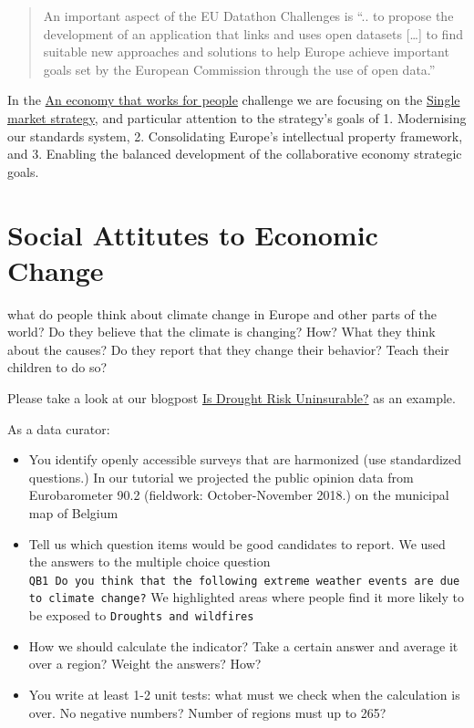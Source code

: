 \documentclass[
  a4paper,
  openany, a4paper, oneside]{book}
\providecommand{\tightlist}{%
  \setlength{\itemsep}{0pt}\setlength{\parskip}{0pt}}
\begin{document}
\begin{quote}
An important aspect of the EU Datathon Challenges is ``.. to propose the development of an application that links and uses open datasets {[}\ldots{]} to find suitable new approaches and solutions to help Europe achieve important goals set by the European Commission through the use of open data.''
\end{quote}

In the \href{https://ec.europa.eu/info/strategy/priorities-2019-2024/economy-works-people_en\#:~:text=Individuals\%20and\%20businesses\%20in\%20the,needs\%20of\%20the\%20EU's\%20citizens.}{An economy that works for people} challenge we are focusing on the \href{https://ec.europa.eu/info/strategy/priorities-2019-2024/economy-works-people/internal-market_en}{Single market strategy}, and particular attention to the strategy's goals of 1. Modernising our standards system, 2. Consolidating Europe's intellectual property framework, and 3. Enabling the balanced development of the collaborative economy strategic goals.

\hypertarget{social-attitutes-to-economic-change}{%
\section{Social Attitutes to Economic Change}\label{social-attitutes-to-economic-change}}

what do people think about climate change in Europe and other parts of the world? Do they believe that the climate is changing? How? What they think about the causes? Do they report that they change their behavior? Teach their children to do so?

Please take a look at our blogpost \href{http://greendeal.dataobservatory.eu/post/2021-04-23-belgium-flood-insurance/}{Is Drought Risk Uninsurable?} as an example.

As a data curator:

\begin{itemize}
\tightlist
\item
  You identify openly accessible surveys that are harmonized (use standardized questions.) In our tutorial we projected the public opinion data from Eurobarometer 90.2 (fieldwork: October-November 2018.) on the municipal map of Belgium
\item
  Tell us which question items would be good candidates to report. We used the answers to the multiple choice question \texttt{QB1\ Do\ you\ think\ that\ the\ following\ extreme\ weather\ events\ are\ due\ to\ climate\ change?} We highlighted areas where people find it more likely to be exposed to \texttt{Droughts\ and\ wildfires}
\item
  How we should calculate the indicator? Take a certain answer and average it over a region? Weight the answers? How?
\item
  You write at least 1-2 unit tests: what must we check when the calculation is over. No negative numbers? Number of regions must up to 265?
\end{itemize}
\end{document}
